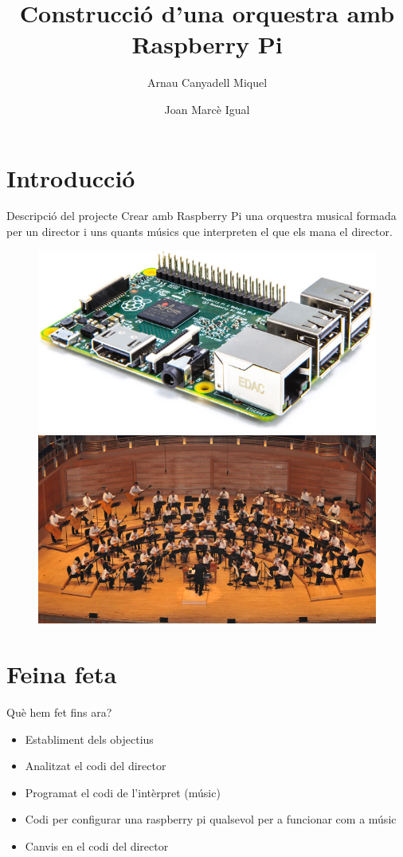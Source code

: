 \documentclass{beamer}
\title{Construcció d'una orquestra amb Raspberry Pi}
\author{Arnau Canyadell Miquel \and Joan Marcè Igual}
\begin{document}
\frame{\titlepage}
\section{Introducció}

\begin{frame}{Descripció del projecte}
	Crear amb Raspberry Pi una orquestra musical formada per un director i uns quants músics que interpreten el que els mana el director.
	\begin{figure}
		\includegraphics[width=0.475\linewidth]{images/raspberry}
		\hfill
		\includegraphics[width=0.475\linewidth]{images/orchestra}
	\end{figure}
\end{frame}

\section{Feina feta}
\begin{frame}{Què hem fet fins ara?}
	\begin{itemize}[<+->]
		\item Establiment dels objectius
		\item Analitzat el codi del director
		\item Programat el codi de l'intèrpret (músic)
		\item Codi per configurar una raspberry pi qualsevol per a funcionar com a músic
		\item Canvis en el codi del director
	\end{itemize}
\end{frame}
\end{document}
